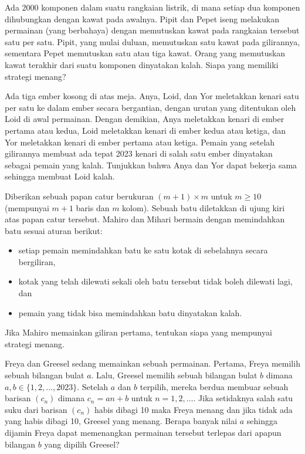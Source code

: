 \documentclass[12pt]{scrartcl}
\begin{document}
\begin{soaljawab}
Ada $2000$ komponen dalam suatu rangkaian listrik, di mana setiap dua komponen dihubungkan dengan kawat pada awalnya. Pipit dan Pepet iseng melakukan permainan (yang berbahaya) dengan memutuskan kawat pada rangkaian tersebut satu per satu. Pipit, yang mulai duluan, memutuskan satu kawat pada gilirannya, sementara Pepet memutuskan satu atau tiga kawat. Orang yang memutuskan kawat terakhir dari suatu komponen dinyatakan kalah. Siapa yang memiliki strategi menang?
\end{soaljawab}

\begin{soaljawab}
Ada tiga ember kosong di atas meja. Anya, Loid, dan Yor meletakkan kenari satu per satu ke dalam ember secara bergantian, dengan urutan yang ditentukan oleh Loid di awal permainan. Dengan demikian, Anya meletakkan kenari di ember pertama atau kedua, Loid meletakkan kenari di ember kedua atau ketiga, dan Yor meletakkan kenari di ember pertama atau ketiga. Pemain yang setelah gilirannya membuat ada tepat 2023 kenari di salah satu ember dinyatakan sebagai pemain yang kalah. Tunjukkan bahwa Anya dan Yor dapat bekerja sama sehingga membuat Loid kalah.
\end{soaljawab}

\begin{soaljawab}
    Diberikan sebuah papan catur berukuran $(m+1) \times m$ untuk $m \ge 10$ (mempunyai $m+1$ baris dan $m$ kolom). Sebuah batu diletakkan di ujung kiri atas papan catur tersebut. Mahiro dan Mihari bermain dengan memindahkan batu sesuai aturan berikut:
    \begin{itemize}
        \item setiap pemain memindahkan batu ke satu kotak di sebelahnya secara bergiliran,
        \item kotak yang telah dilewati sekali oleh batu tersebut tidak boleh dilewati lagi, dan
        \item pemain yang tidak bisa memindahkan batu dinyatakan kalah.
    \end{itemize}
    Jika Mahiro memainkan giliran pertama, tentukan siapa yang mempunyai strategi menang.
\end{soaljawab}

\begin{soaljawab}
    Freya dan Greesel sedang memainkan sebuah permainan. Pertama, Freya memilih sebuah bilangan bulat $a$. Lalu, Greesel memilih sebuah bilangan bulat $b$ dimana $a,b \in \{1,2,\dots,2023\}$. Setelah $a$ dan $b$ terpilih, mereka berdua membuar sebuah barisan $(c_n)$ dimana $c_n = an + b$ untuk $n = 1,2,\dots$. Jika setidaknya salah satu suku dari barisan $(c_n)$ habis dibagi 10 maka Freya menang dan jika tidak ada yang habis dibagi 10, Greesel yang menang. Berapa banyak nilai $a$ sehingga dijamin Freya dapat memenangkan permainan tersebut terlepas dari apapun bilangan $b$ yang dipilih Greesel?
\end{soaljawab}
\end{document}

